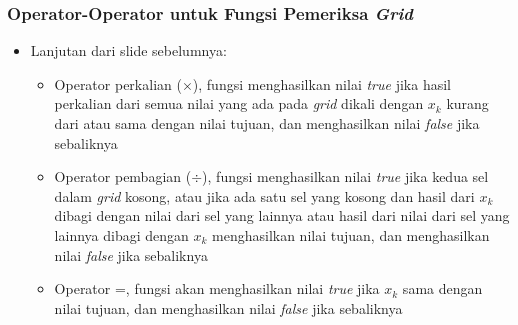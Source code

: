 \documentclass{beamer}
\begin{document}
\begin{frame}
\frametitle{Operator-Operator untuk Fungsi Pemeriksa \protect\textit{Grid}}
\begin{itemize}
\item Lanjutan dari slide sebelumnya:
	\begin{itemize}
	\item Operator perkalian (\begin{math}\times\end{math}), fungsi menghasilkan nilai \textit{true} jika hasil perkalian dari semua nilai yang ada pada \textit{grid} dikali dengan \begin{math}x_k\end{math} kurang dari atau sama dengan nilai tujuan, dan menghasilkan nilai \textit{false} jika sebaliknya
	\item Operator pembagian (\begin{math}\div\end{math}), fungsi menghasilkan nilai \textit{true} jika kedua sel dalam \textit{grid} kosong, atau jika ada satu sel yang kosong dan hasil dari \begin{math}x_k\end{math} dibagi dengan nilai dari sel yang lainnya atau hasil dari nilai dari sel yang lainnya dibagi dengan \begin{math}x_k\end{math} menghasilkan nilai tujuan, dan menghasilkan nilai \textit{false} jika sebaliknya
	\item Operator =, fungsi akan menghasilkan nilai \textit{true} jika \begin{math}x_k\end{math} sama dengan nilai tujuan, dan menghasilkan nilai \textit{false} jika sebaliknya
	\end{itemize}
\end{itemize}
\end{frame}
\end{document}

